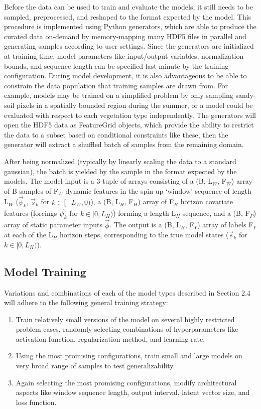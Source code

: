 \documentclass[11pt]{article}
\begin{document}
\begin{multicols}{2}
    Before the data can be used to train and evaluate the models, it still needs to be sampled, preprocessed, and reshaped to the format expected by the model. This procedure is implemented using Python generators, which are able to produce the curated data on-demand by memory-mapping many HDF5 files in parallel and generating samples according to user settings. Since the generators are initialized at training time, model parameters like input/output variables, normalization bounds, and sequence length can be specified last-minute by the training configuration. During model development, it is also advantageous to be able to constrain the data population that training samples are drawn from. For example, models may be trained on a simplified problem by only sampling sandy-soil pixels in a spatially bounded region during the summer, or a model could be evaluated with respect to each vegetation type independently. The generators will open the HDF5 data as FeatureGrid objects, which provide the ability to restrict the data to a subset based on conditional constraints like these, then the generator will extract a shuffled batch of samples from the remaining domain.

    After being normalized (typically by linearly scaling the data to a standard gaussian), the batch is yielded by the sample in the format expected by the models. The model input is a 3-tuple of arrays consisting of a (B, L$_W$, F$_W$) array of B samples of F$_W$ dynamic features in the spin-up `window' sequence of length L$_W$ ($\vec{\psi}_k$, $\vec{s}_k$ for $k \in [-L_W,0)$), a (B, L$_H$, F$_H$) array of F$_H$ horizon covariate features (forcings $\vec{\psi}_k$ for $k \in [0,L_H)$) forming a length L$_H$ sequence, and a (B, F$_P$) array of static parameter inputs $\vec{\phi}$. The output is a (B, L$_H$, F$_Y$) array of labels F$_Y$ at each of the L$_H$ horizon steps, corresponding to the true model states ($\vec{s}_k$ for $k \in [0,L_H)$).

    \subsection{Model Training}

    Variations and combinations of each of the model types described in Section 2.4 will adhere to the following general training strategy:

    \begin{enumerate}
        \item Train relatively small versions of the model on several highly restricted problem cases, randomly selecting combinations of hyperparameters like activation function, regularization method, and learning rate.
        \item Using the most promising configurations, train small and large models on very broad range of samples to test generalizability.
        \item Again selecting the most promising configurations, modify architectural aspects like window sequence length, output interval, latent vector size, and loss function.
    \end{enumerate}


\end{multicols}
\end{document}
